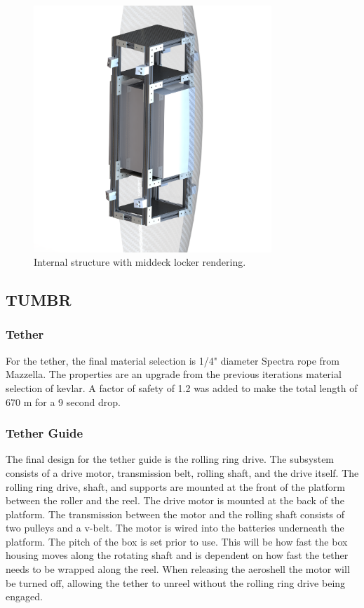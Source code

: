 \begin{figure}[H]
  \centering
  \includegraphics[width=0.8\textwidth]{Aeroshell/Aeroshell3.png}
  \caption{\label{fig:aeroshell3}Internal structure with middeck locker rendering.}
\end{figure}

\subsection{TUMBR}

\subsubsection{Tether}

\indent\indent For the tether, the final material selection is 1/4" diameter Spectra rope from Mazzella. The properties are an upgrade from the previous iterations material selection of kevlar. A factor of safety of 1.2 was added to make the total length of 670 m for a 9 second drop.

\subsubsection{Tether Guide}

\indent\indent The final design for the tether guide is the rolling ring drive. The subsystem consists of a drive motor, transmission belt, rolling shaft, and the drive itself. The rolling ring drive, shaft, and supports are mounted at the front of the platform between the roller and the reel. The drive motor is mounted at the back of the platform. The transmission between the motor and the rolling shaft consists of two pulleys and a v-belt. The motor is wired into the batteries underneath the platform. The pitch of the box is set prior to use. This will be how fast the box housing moves along the rotating shaft and is dependent on how fast the tether needs to be wrapped along the reel. When releasing the aeroshell the motor will be turned off, allowing the tether to unreel without the rolling ring drive being engaged. 

